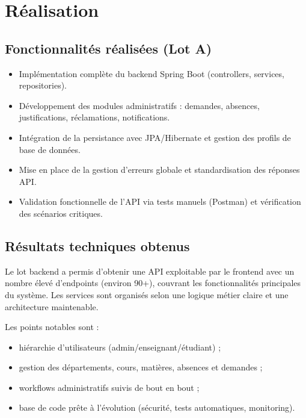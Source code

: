 \chapter{Réalisation}

\section{Fonctionnalités réalisées (Lot A)}
\begin{itemize}
  \item Implémentation complète du backend Spring Boot (controllers, services, repositories).
  \item Développement des modules administratifs : demandes, absences, justifications, réclamations, notifications.
  \item Intégration de la persistance avec JPA/Hibernate et gestion des profils de base de données.
  \item Mise en place de la gestion d'erreurs globale et standardisation des réponses API.
  \item Validation fonctionnelle de l'API via tests manuels (Postman) et vérification des scénarios critiques.
\end{itemize}

\section{Résultats techniques obtenus}
Le lot backend a permis d'obtenir une API exploitable par le frontend avec un nombre élevé d'endpoints (environ 90+), couvrant les fonctionnalités principales du système. Les services sont organisés selon une logique métier claire et une architecture maintenable.

Les points notables sont :
\begin{itemize}
  \item hiérarchie d'utilisateurs (admin/enseignant/étudiant) ;
  \item gestion des départements, cours, matières, absences et demandes ;
  \item workflows administratifs suivis de bout en bout ;
  \item base de code prête à l'évolution (sécurité, tests automatiques, monitoring).
\end{itemize}

